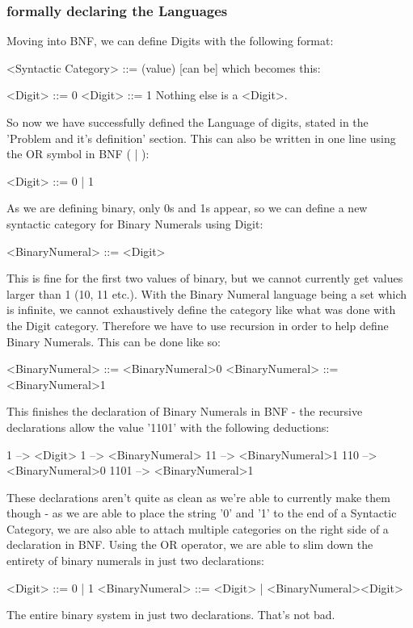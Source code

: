 \documentclass[12pt]{article}
\begin{document}
\subsubsection{formally declaring the Languages}
\label{sec-2-3-3}

Moving into BNF, we can define Digits with the following format:

<Syntactic Category> ::= (value)
                   [can be]
which becomes this:

<Digit> ::= 0
<Digit> ::= 1
Nothing else is a <Digit>.

So now we have successfully defined the Language of digits, stated in the
'Problem and it's definition' section.  This can also be written in one line
using the OR symbol in BNF ( | ):

<Digit> ::= 0 | 1

As we are defining binary, only 0s and 1s appear, so we can define a new
syntactic category for Binary Numerals using Digit:

<BinaryNumeral> ::= <Digit>

This is fine for the first two values of binary, but we cannot currently get
values larger than 1 (10, 11 etc.).  With the Binary Numeral language being a
set which is infinite, we cannot exhaustively define the category like what
was done with the Digit category.  Therefore we have to use recursion in order
to help define Binary Numerals.  This can be done like so:

<BinaryNumeral> ::= <BinaryNumeral>0
<BinaryNumeral> ::= <BinaryNumeral>1

This finishes the declaration of Binary Numerals in BNF - the recursive
declarations allow the value '1101' with the following deductions:

1    --> <Digit>
1    --> <BinaryNumeral>
11   --> <BinaryNumeral>1
110  --> <BinaryNumeral>0
1101 --> <BinaryNumeral>1

These declarations aren't quite as clean as we're able to currently make them
though - as we are able to place the string '0' and '1' to the end of a
Syntactic Category, we are also able to attach multiple categories on the right
side of a declaration in BNF.  Using the OR operator, we are able to slim down
the entirety of binary numerals in just two declarations:

<Digit> ::= 0 | 1
<BinaryNumeral> ::= <Digit> | <BinaryNumeral><Digit>

The entire binary system in just two declarations.  That's not bad.
\end{document}
